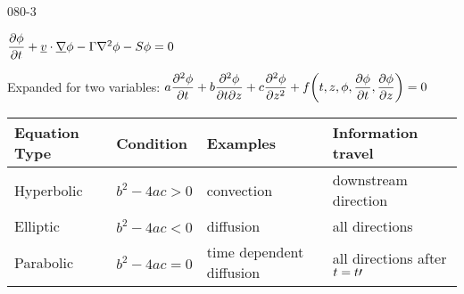 \begin{mitframe}{080-3}
        
\begin{listone}
	\item $\dfrac{\partial\eleccoeff}{\partial\timet}+\uline{\vvel}\cdot\gradop\eleccoeff-\Gamma\nabla^2\eleccoeff-\entropy\eleccoeff=0$

	\item Expanded for two variables: $a\dfrac{\partial^2\eleccoeff}{\partial\timet}+b\dfrac{\partial^2\eleccoeff}{\partial\timet\partial\heightz}+c\dfrac{\partial^2\eleccoeff}{\partial{\heightz}^2}+\fug\bigg(\timet,\heightz,\eleccoeff,\dfrac{\partial\eleccoeff}{\partial\timet},\dfrac{\partial\eleccoeff}{\partial{\heightz}}\bigg)=0$
\end{listone}     

\begin{center}
\begin{tabular}
{| >{\centering\arraybackslash}m{2.3cm} | >{\centering\arraybackslash}m{2cm} |>{\centering\arraybackslash}m{2.5cm} |>{\centering\arraybackslash}m{3cm} |}
\hline 
 
Equation Type &%
Condition &%
Examples &%
Information travel\\ \hline

Hyperbolic &%
$b^2-4ac>0$ &%
convection &%
downstream direction\\ \hline

Elliptic &%
$b^2-4ac<0$ &%
diffusion &%
all directions\\ \hline

Parabolic &%
$b^2-4ac=0$ &%
time dependent diffusion &%
all directions after $\timet = {\timet}\prime$\\ \hline    
 
\end{tabular}
\end{center}

\end{mitframe}